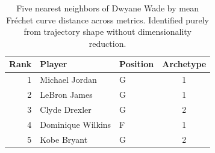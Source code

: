 \begin{table}[htbp]
  \centering\small
  \begin{tabular}{rllc}
    \toprule
    Rank & Player & Position & Archetype \\
    \midrule
    1 & Michael Jordan & G & 1 \\
    2 & LeBron James & G & 1 \\
    3 & Clyde Drexler & G & 2 \\
    4 & Dominique Wilkins & F & 1 \\
    5 & Kobe Bryant & G & 2 \\
    \bottomrule
  \end{tabular}
  \caption{Five nearest neighbors of Dwyane Wade by mean Fr\'{e}chet curve distance across metrics. Identified purely from trajectory shape without dimensionality reduction.}
  \label{tab:Dwyane_Wade_frechet_curve_neighbors}
\end{table}

